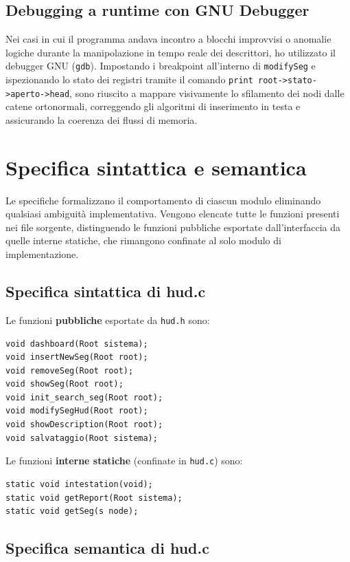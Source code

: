 \documentclass[12pt, a4paper]{article}
\begin{document}
\newpage

\subsection{Debugging a runtime con GNU Debugger}
Nei casi in cui il programma andava incontro a blocchi improvvisi o anomalie logiche durante la manipolazione in tempo reale dei descrittori, ho utilizzato il debugger GNU (\texttt{gdb}). Impostando i breakpoint all'interno di \texttt{modifySeg} e ispezionando lo stato dei registri tramite il comando \texttt{print root->stato->aperto->head}, sono riuscito a mappare visivamente lo sfilamento dei nodi dalle catene ortonormali, correggendo gli algoritmi di inserimento in testa e assicurando la coerenza dei flussi di memoria.

\section{Specifica sintattica e semantica}

Le specifiche formalizzano il comportamento di ciascun modulo eliminando qualsiasi ambiguità implementativa. Vengono elencate tutte le funzioni presenti nei file sorgente, distinguendo le funzioni pubbliche esportate dall'interfaccia da quelle interne statiche, che rimangono confinate al solo modulo di implementazione.

\subsection{Specifica sintattica di hud.c}

Le funzioni \textbf{pubbliche} esportate da \texttt{hud.h} sono:
\begin{lstlisting}[style=cstyle, numbers=none]
void dashboard(Root sistema);
void insertNewSeg(Root root);
void removeSeg(Root root);
void showSeg(Root root);
void init_search_seg(Root root);
void modifySegHud(Root root);
void showDescription(Root root);
void salvataggio(Root sistema);
\end{lstlisting}

Le funzioni \textbf{interne statiche} (confinate in \texttt{hud.c}) sono:
\begin{lstlisting}[style=cstyle, numbers=none]
static void intestation(void);
static void getReport(Root sistema);
static void getSeg(s node);
\end{lstlisting}

\subsection{Specifica semantica di hud.c}
\end{document}
